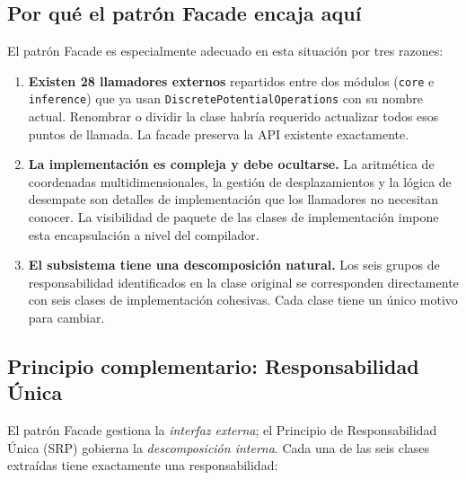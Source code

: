 \documentclass[11pt,a4paper]{article}
\newcommand{\code}[1]{\texttt{#1}}
\begin{document}
\subsection{Por qu\'e el patr\'on Facade encaja aqu\'i}

El patr\'on Facade es especialmente adecuado en esta situaci\'on por tres razones:

\begin{enumerate}
  \item \textbf{Existen 28 llamadores externos} repartidos entre dos m\'odulos
        (\code{core} e \code{inference}) que ya usan
        \code{DiscretePotentialOperations} con su nombre actual.  Renombrar o
        dividir la clase habr\'ia requerido actualizar todos esos puntos de llamada.
        La facade preserva la API existente exactamente.

  \item \textbf{La implementaci\'on es compleja y debe ocultarse.}  La aritm\'etica
        de coordenadas multidimensionales, la gesti\'on de desplazamientos y la
        l\'ogica de desempate son detalles de implementaci\'on que los llamadores
        no necesitan conocer.  La visibilidad de paquete de las clases de
        implementaci\'on impone esta encapsulaci\'on a nivel del compilador.

  \item \textbf{El subsistema tiene una descomposici\'on natural.}  Los seis grupos
        de responsabilidad identificados en la clase original se corresponden
        directamente con seis clases de implementaci\'on cohesivas.  Cada clase
        tiene un \'unico motivo para cambiar.
\end{enumerate}

\subsection{Principio complementario: Responsabilidad \'Unica}

El patr\'on Facade gestiona la \emph{interfaz externa}; el Principio de
Responsabilidad \'Unica (SRP) gobierna la \emph{descomposici\'on interna}.  Cada
una de las seis clases extra\'idas tiene exactamente una responsabilidad:
\end{document}
